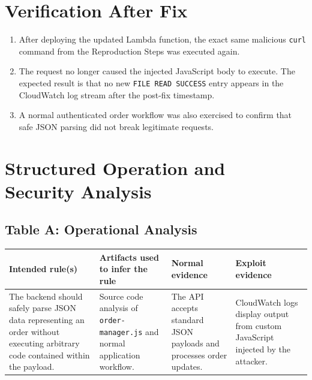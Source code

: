 \documentclass[12pt]{report}
\begin{document}
\section{Verification After Fix}
\begin{enumerate}
  \item After deploying the updated Lambda function, the exact same malicious \texttt{curl} command from the Reproduction Steps was executed again.
  \item The request no longer caused the injected JavaScript body to execute. The expected result is that no new \texttt{FILE READ SUCCESS} entry appears in the CloudWatch log stream after the post-fix timestamp.
  \item A normal authenticated order workflow was also exercised to confirm that safe JSON parsing did not break legitimate requests.
\end{enumerate}
\section[Structured Operation and Security Analysis]{Structured Operation and\\Security Analysis}
\subsection*{Table A: Operational Analysis}
\begin{table}[H]
  \small
  \centering
  \begin{tabularx}{\textwidth}{|Y|Y|Y|Y|}
    \hline
    \textbf{Intended rule(s)} & \textbf{Artifacts used to infer the rule} & \textbf{Normal evidence} & \textbf{Exploit evidence} \\
    \hline
    The backend should safely parse JSON data representing an order without executing arbitrary code contained within the payload. &
    Source code analysis of \nolinkurl{order-manager.js} and normal application workflow. &
    The API accepts standard JSON payloads and processes order updates. &
    CloudWatch logs display output from custom JavaScript injected by the attacker. \\
    \hline
  \end{tabularx}
\end{table}
\end{document}
